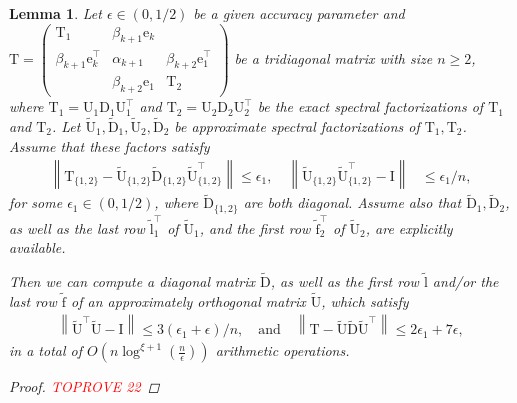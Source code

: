 \documentclass{article}
\newcommand{\lnorm}{\left\|}
\newcommand{\rnorm}{\right\|}
\newcommand{\lpar}{\left(}
\newcommand{\rpar}{\right)}
\newtheorem{lemma}{Lemma}[section]
\newcommand\vece{\boldsymbol{\mathrm{e}}}
\newcommand\vecftilde{\widetilde{\boldsymbol{\mathrm{f}}}}
\newcommand\vecltilde{\widetilde{\boldsymbol{\mathrm{l}}}}
\newcommand\matD{\boldsymbol{\mathrm{D}}}
\newcommand\matI{\boldsymbol{\mathrm{I}}}
\newcommand\matT{\boldsymbol{\mathrm{T}}}
\newcommand\matU{\boldsymbol{\mathrm{U}}}
\newcommand\matDtilde{\widetilde{\boldsymbol{\mathrm{D}}}}
\newcommand\matUtilde{\widetilde{\boldsymbol{\mathrm{U}}}}
\newcommand{\cfmm}{\xi}
\begin{document}
\begin{lemma}
    \label{lemma:tridiagonal_assembly_eigenvalues_only}
Let $\epsilon\in(0,1/2)$ be a given accuracy parameter and $\matT = \begin{pmatrix}
    \matT_1 & \beta_{k+1}\vece_k & \\
    \beta_{k+1}\vece_k^\top & \alpha_{k+1} & \beta_{k+2}\vece_1^\top \\
     & \beta_{k+2}\vece_1 & \matT_2
\end{pmatrix}$ be a tridiagonal matrix with size $n\geq 2$, where $\matT_1=\matU_1\matD_1\matU_1^\top$ and $\matT_2=\matU_2\matD_2\matU_2^\top$ be the exact spectral factorizations of $\matT_1$ and $\matT_2$. Let $\matUtilde_1,\matDtilde_1,\matUtilde_2,\matDtilde_2$ be approximate spectral factorizations of $\matT_1,\matT_2$. Assume that these factors satisfy
    \begin{align*}
        \lnorm
            \matT_{\{1,2\}} - \matUtilde_{\{1,2\}}\matDtilde_{\{1,2\}}\matUtilde_{\{1,2\}}^\top
        \rnorm 
        \leq \epsilon_1,
        \quad
        \lnorm \matUtilde_{\{1,2\}}\matUtilde_{\{1,2\}}^\top -\matI \rnorm &\leq \epsilon_1/n,
    \end{align*}
    for some $\epsilon_1\in(0,1/2)$, where $\matDtilde_{\{1,2\}}$ are both diagonal. Assume also that $\matDtilde_1,\matDtilde_2$, as well as the last row $\vecltilde_1^\top$ of $\matUtilde_1$, and the first row $\vecftilde_2^\top$ of $\matUtilde_2$, are explicitly available. 
    
    Then we can compute a diagonal matrix $\matDtilde$, as well as the first row $\vecltilde$ and/or the last row $\vecftilde$ of an approximately orthogonal matrix $\matUtilde$, which satisfy
    \begin{align*}
        \lnorm\matUtilde^\top\matUtilde-\matI\rnorm\leq 3(\epsilon_1+\epsilon)/n,
        \quad \text{and} \quad
        \lnorm 
            \matT-\matUtilde\matDtilde\matUtilde^\top
        \rnorm \leq 2\epsilon_1+7\epsilon,
    \end{align*}
    in a total of $O\lpar n\log^{\cfmm+1}(\tfrac{n}{\epsilon})\rpar$ arithmetic operations.
    \begin{proof}\textcolor{red}{TOPROVE 22}\end{proof}
\end{lemma}
\end{document}
